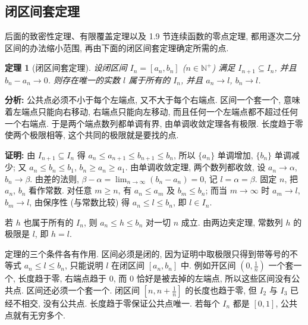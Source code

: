 \documentclass[UTF8,openany]{ctexbook}
\theoremstyle{chinesetextbook}
\newtheorem{theorem}{定理}[section]
\newenvironment{cnproof}{\par\indent\textbf{证明:} \ignorespaces}{\par}
\begin{document}
\subsection{闭区间套定理}
后面的致密性定理、有限覆盖定理以及 1.9 节连续函数的零点定理, 都用逐次二分区间的办法缩小范围, 再由下面的闭区间套定理确定所需的点.
\begin{theorem}[闭区间套定理]
设闭区间 $I_n=[a_n,b_n]$ ($n\in\mathbb N^+$) 满足 $I_{n+1}\subseteq I_n$, 并且 $b_n-a_n\to0$. 则存在唯一的实数 $l$ 属于所有的 $I_n$, 并且 $a_n\to l$, $b_n\to l$.
\end{theorem}
\par\indent\textbf{分析:} 公共点必须不小于每个左端点, 又不大于每个右端点. 区间一个套一个, 意味着左端点只能向右移动, 右端点只能向左移动, 而且任何一个左端点都不超过任何一个右端点. 于是两个端点数列都单调有界, 由单调收敛定理各有极限. 长度趋于零使两个极限相等, 这个共同的极限就是要找的点.
\begin{cnproof}
由 $I_{n+1}\subseteq I_n$ 得 $a_n\le a_{n+1}\le b_{n+1}\le b_n$, 所以 $\{a_n\}$ 单调增加, $\{b_n\}$ 单调减少; 又 $a_n\le b_n\le b_1$, $b_n\ge a_n\ge a_1$. 由单调收敛定理, 两个数列都收敛, 设 $a_n\to\alpha$, $b_n\to\beta$. 由差的法则, $\displaystyle\beta-\alpha=\lim_{n\to\infty}(b_n-a_n)=0$, 记 $l=\alpha=\beta$. 固定 $n$, 把 $a_n$, $b_n$ 看作常数. 对任意 $m\ge n$, 有 $a_n\le a_m$ 及 $b_m\le b_n$; 而当 $m\to\infty$ 时 $a_m\to l$, $b_m\to l$, 由保序性 (与常数比较) 得 $a_n\le l\le b_n$, 即 $l\in I_n$.

若 $h$ 也属于所有的 $I_n$, 则 $a_n\le h\le b_n$ 对一切 $n$ 成立. 由两边夹定理, 常数列 $h$ 的极限是 $l$, 即 $h=l$.
\end{cnproof}
定理的三个条件各有作用. 区间必须是闭的, 因为证明中取极限只得到带等号的不等式 $a_n\le l\le b_n$, 只能说明 $l$ 在闭区间 $[a_n,b_n]$ 中. 例如开区间 $\displaystyle\left(0,\frac1n\right)$ 一个套一个, 长度趋于零, 右端点趋于 $0$, 而 $0$ 恰好是被去掉的左端点, 所以这些区间没有公共点. 区间还必须一个套一个. 闭区间 $\displaystyle\left[n,n+\frac1n\right]$ 的长度也趋于零, 但 $I_2$ 与 $I_3$ 已经不相交, 没有公共点. 长度趋于零保证公共点唯一. 若每个 $I_n$ 都是 $[0,1]$, 公共点就有无穷多个.
\end{document}
